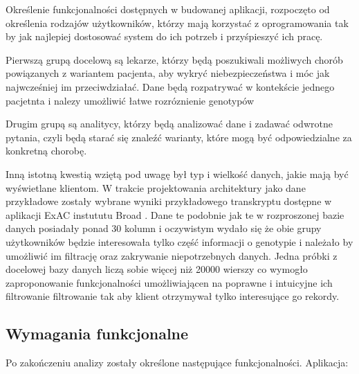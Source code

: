 \documentclass[a4paper,12pt,twoside]{article}
\begin{document}
Określenie funkcjonalności dostępnych w budowanej aplikacji, rozpoczęto od określenia 
rodzajów użytkowników, którzy mają korzystać z oprogramowania tak by jak najlepiej dostosować system do ich potrzeb i przyśpieszyć ich pracę.

Pierwszą grupą docelową są lekarze, którzy będą poszukiwali
możliwych chorób powiązanych z wariantem pacjenta, aby wykryć niebezpieczeństwa
i móc jak najwcześniej im przeciwdziałać. 
Dane będą rozpatrywać w kontekście jednego pacjetnta i nalezy umożliwić łatwe rozróznienie genotypów

Drugim grupą są analitycy, którzy będą analizować dane i zadawać 
odwrotne pytania, czyli będą starać się znaleźć warianty, które mogą być odpowiedzialne
za konkretną chorobę. 

Inną istotną kwestią wziętą pod uwagę był typ i wielkość danych, jakie mają być wyświetlane klientom.
W trakcie projektowania architektury jako dane przykładowe zostały wybrane wyniki przykładowego transkryptu dostępne w aplikacji ExAC instututu Broad \cite{exac} \cite{exacCite}. Dane te 
podobnie jak te w rozproszonej bazie danych posiadały ponad 30 kolumn i oczywistym wydało się że obie grupy użytkowników będzie interesowała tylko część informacji o genotypie i należało by umożliwić im filtrację oraz zakrywanie niepotrzebnych danych. 
Jedna próbki z docelowej bazy danych liczą sobie więcej niż 20000 wierszy co wymogło zaproponowanie 
funkcjonalności umożliwiającen na poprawne i intuicyjne ich filtrowanie filtrowanie 
tak aby klient otrzymywał tylko interesujące go rekordy.

\newpage
\subsection{Wymagania funkcjonalne}
Po zakończeniu analizy zostały określone następujące funkcjonalności. Aplikacja:
\end{document}
